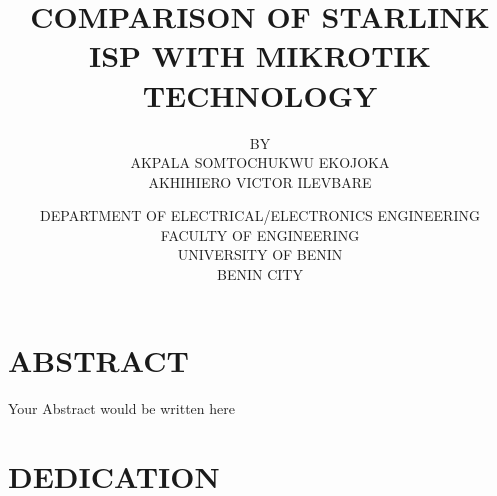 \documentclass[a4size, 12pt]{report}
\title{COMPARISON OF STARLINK ISP WITH MIKROTIK TECHNOLOGY}
\author{BY \\
		AKPALA SOMTOCHUKWU EKOJOKA\\
		AKHIHIERO VICTOR ILEVBARE}
\date{DEPARTMENT OF ELECTRICAL/ELECTRONICS ENGINEERING\\
FACULTY OF ENGINEERING\\
UNIVERSITY OF BENIN\\
BENIN CITY}
\begin{document}
\maketitle
\chapter*{ABSTRACT}
Your Abstract would be written here
\chapter*{DEDICATION}

\end{document}
